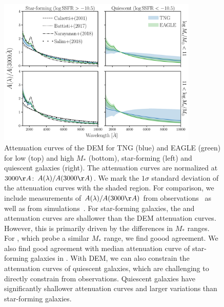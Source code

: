 

\begin{figure}
\begin{center}
    \includegraphics[width=0.85\textwidth]{figs/abc_attenuation.pdf}
    \caption{\label{fig:atten}
    Attenuation curves of the DEM for TNG (blue) and EAGLE (green) for 
    low (top) and high $M_*$ (bottom), star-forming (left) and
    quiescent galaxies (right). The attenuation curves are normalized at
    $3000\AA$: $A(\lambda)/A(3000\AA)$. We mark the $1\sigma$ standard
    deviation of the attenuation curves with the shaded region. For comparison,
    we include measurements of $A(\lambda)/A(3000\AA)$ from 
    observations~\citep{calzetti2000, battisti2017, salim2018} as well as
    from simulations~\citep{narayanan2018}. For star-forming galaxies, the 
    \cite{calzetti2000} and \cite{battisti2017} attenuation curves are shallower 
    than the DEM attenuation curves. However, this is primarily driven by the
    differences in $M_*$ ranges. For \cite{salim2018}, which probe a similar
    $M_*$ range, we find goood agreement. We also find good agreement with 
    median attenuation curve of star-forming galaxies in \cite{narayanan2018}.
    With DEM, we can also constrain the attenuation curves of quiescent galaxies,
    which are challenging to directly constrain from observations. Quiescent 
    galaxies have significantly shallower attenuation curves and larger
    variations than star-forming galaxies. 
    }
\end{center}
\end{figure}


